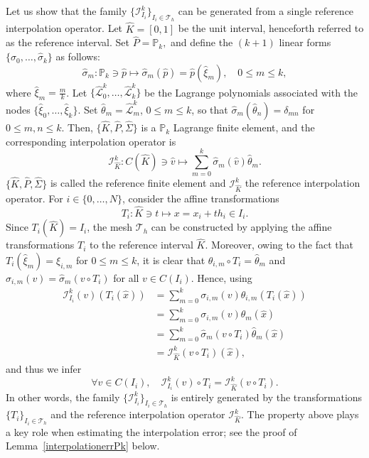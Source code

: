 \documentclass{article}
\begin{document}
Let us show that the family $\{\mathcal{I}_{I_i}^k\}_{I_i \in \mathcal{T}_h}$ can be generated from a single reference interpolation operator. Let $\hat{K} = [0, 1]$ be the unit interval, henceforth referred to as the reference interval. Set $\hat{P} = \mathbb{P}_k,$ and define the $(k+1)$ linear forms $\{\hat{\sigma}_0, \dots, \hat{\sigma}_k\}$ as follows:
$$ \hat{\sigma}_m: \mathbb{P}_k \ni \hat{p} \mapsto \hat{\sigma}_m(\hat{p}) = \hat{p}(\hat{\xi}_m), \quad 0 \le m \le k, $$
where $\hat{\xi}_m = \frac{m}{k}$. Let $\{\hat{\mathcal{L}}_0^k, \dots, \hat{\mathcal{L}}_k^k\}$ be the Lagrange polynomials associated with the nodes $\{\hat{\xi}_0, \dots, \hat{\xi}_k\}$. Set $\hat{\theta}_m = \hat{\mathcal{L}}_m^k$, $0 \le m \le k$, so that $\hat{\sigma}_m(\hat{\theta}_n) = \delta_{mn}$ for $0 \le m,n \le k$. Then, $\{\hat{K}, \hat{P}, \hat{\Sigma}\}$ is a $\mathbb{P}_k$ Lagrange finite element, and the corresponding interpolation operator is
$$ \mathcal{I}_{\hat{K}}^k: C(\hat{K}) \ni \hat{v} \mapsto \sum_{m=0}^k \hat{\sigma}_m(\hat{v}) \hat{\theta}_m. $$
$\{\hat{K}, \hat{P}, \hat{\Sigma}\}$ is called the reference finite element and $\mathcal{I}_{\hat{K}}^k$ the reference interpolation operator. For $i \in \{0, \dots, N\}$, consider the affine transformations
$$ T_i: \hat{K} \ni t \mapsto x = x_i + th_i \in I_i. $$
Since $T_i(\hat{K}) = I_i$, the mesh $\mathcal{T}_h$ can be constructed by applying the affine transformations $T_i$ to the reference interval $\hat{K}$. Moreover, owing to the fact that $T_i(\hat{\xi}_m) = \xi_{i,m}$ for $0 \le m \le k$, it is clear that $\theta_{i,m} \circ T_i = \hat{\theta}_m$ and $\sigma_{i,m}(v) = \hat{\sigma}_m(v \circ T_i)$ for all $v \in C(I_i)$. Hence, using
\begin{align*}
    \mathcal{I}_{I_i}^k(v)(T_i(\hat{x})) &= \sum_{m=0}^k \sigma_{i,m}(v) \theta_{i,m}(T_i(\hat{x})) \\
    &= \sum_{m=0}^k \sigma_{i,m}(v) \hat{\theta}_m(\hat{x}) \\
    &= \sum_{m=0}^k \hat{\sigma}_m(v \circ T_i) \hat{\theta}_m(\hat{x})\\
    & = \mathcal{I}_{\hat{K}}^k(v \circ T_i)(\hat{x}),
\end{align*}
and thus we infer
$$ \forall v \in C(I_i), \quad \mathcal{I}_{I_i}^k(v) \circ T_i = \mathcal{I}_{\hat{K}}^k(v \circ T_i). $$
In other words, the family $\{\mathcal{I}_{I_i}^k\}_{I_i \in \mathcal{T}_h}$ is entirely generated by the transformations $\{T_i\}_{I_i \in \mathcal{T}_h}$ and the reference interpolation operator $\mathcal{I}_{\hat{K}}^k$. The property above plays a key role when estimating the interpolation error; see the proof of Lemma~\ref{interpolationerrPk} below.
\end{document}
